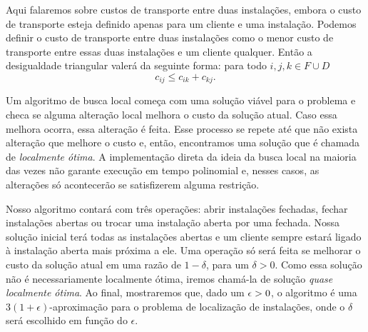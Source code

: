 Aqui falaremos sobre custos de transporte entre duas instalações, embora o custo de transporte esteja definido apenas para um cliente e uma instalação.
Podemos definir o custo de transporte entre duas instalações como o menor custo de transporte entre essas duas instalações e um cliente qualquer. Então a desigualdade triangular valerá da seguinte forma: para todo $i,j,k \in F \cup D$ 
\[ c_{ij} \leq c_{ik} + c_{kj}.\]

Um algoritmo de busca local começa com uma solução viável para o problema e checa se alguma alteração local melhora o custo da solução atual. Caso essa melhora ocorra, essa alteração é feita. Esse processo se repete até que não exista alteração que melhore o custo e, então, encontramos uma solução que é chamada de \emph{localmente ótima}. A implementação direta da ideia da busca local na maioria das vezes não garante execução em tempo polinomial e, nesses casos, as alterações só acontecerão se satisfizerem alguma restrição. 

Nosso algoritmo contará com três operações: abrir instalações fechadas, fechar instalações abertas ou trocar uma instalação aberta por uma fechada. Nossa solução inicial terá todas as instalações abertas e um cliente sempre estará ligado à instalação aberta mais próxima a ele. Uma operação só será feita se melhorar o custo da solução atual em uma razão de $1-\delta$, para um $\delta>0$. Como essa solução não é necessariamente localmente ótima, iremos chamá-la de solução \emph{quase localmente ótima}. Ao final, mostraremos que, dado um $\epsilon > 0$, o algoritmo é uma $3(1 + \epsilon)$-aproximação para o problema de localização de instalações, onde o $\delta$ será escolhido em função do $\epsilon$.

